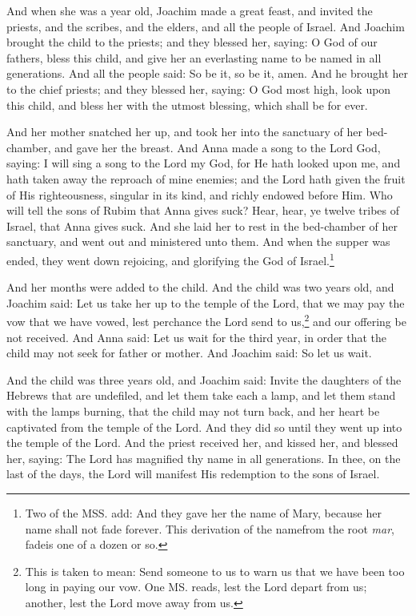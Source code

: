 \pend\pstart
And when she was a year old, Joachim made a great feast, and invited the priests, and the scribes, and the elders, and all the people of Israel. And Joachim brought the child to the priests; and they blessed her, saying: O God of our fathers, bless this child, and give her an everlasting name to be named in all generations. And all the people said: So be it, so be it, amen. And he brought her to the chief priests; and they blessed her, saying: O God most high, look upon this child, and bless her with the utmost blessing, which shall be for ever.

\pend\pstart
And her mother snatched her up, and took her into the sanctuary of her bed-chamber, and gave her the breast. And Anna made a song to the Lord God, saying: I will sing a song to the Lord my God, for He hath looked upon me, and hath taken away the reproach of mine enemies; and the Lord hath given the fruit of His righteousness, singular in its kind, and richly endowed before Him. Who will tell the sons of Rubim that Anna gives suck? Hear, hear, ye twelve tribes of Israel, that Anna gives suck. And she laid her to rest in the bed-chamber of her sanctuary, and went out and ministered unto them. And when the supper was ended, they went down rejoicing, and glorifying the God of Israel.\footnote{Two of the MSS. add: And they gave her the name of Mary, because her name shall not fade forever. This derivation of the name\textemdash from the root \textit{mar}, fade\textemdash is one of a dozen or so.}

\pend\pstart
{}

\pend\setcounter{pstartR}{1}\pstart
And her months were added to the child. And the child was two years old, and Joachim said: Let us take her up to the temple of the Lord, that we may pay the vow that we have vowed, lest perchance the Lord send to us,\footnote{This is taken to mean: Send someone to us to warn us that we have been too long in paying our vow. One MS. reads, lest the Lord depart from us; another, lest the Lord move away from us.} and our offering be not received. And Anna said: Let us wait for the third year, in order that the child may not seek for father or mother. And Joachim said: So let us wait.

\pend\pstart
And the child was three years old, and Joachim said: Invite the daughters of the Hebrews that are undefiled, and let them take each a lamp, and let them stand with the lamps burning, that the child may not turn back, and her heart be captivated from the temple of the Lord. And they did so until they went up into the temple of the Lord. And the priest received her, and kissed her, and blessed her, saying: The Lord has magnified thy name in all generations. In thee, on the last of the days, the Lord will manifest His redemption to the sons of Israel.

